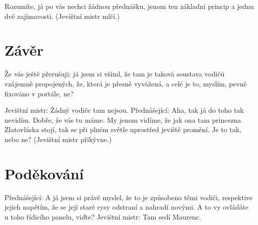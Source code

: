 \documentclass[11pt]{article}
\begin{document}
Rozumíte, já po vás nechci žádnou přednášku, jenom ten základní princip a jednu dvě zajímavosti. (Jevištní mistr mlčí.)
\section{Závěr}
Že vás ještě přerušuji: já jsem si všiml, že tam je taková soustava vodičů vzájemně propojených, že, která je přesně vyvážená, a celé je to, myslím, pevně fixováno v portále, ne?

Jevištní mistr: Žádný vodiče tam nejsou. Přednášející: Aha, tak já do toho tak nevidím. Dobře, že vás tu máme. My jenom vidíme, že jak ona tam princezna Zlatovláska stojí, tak se při plném světle uprostřed jeviště promění. Je to tak, nebo ne? (Jevištní mistr přikývne.)
\section*{Poděkování}
Přednášející: A já jsem si právě myslel, že to je způsobeno těmi vodiči, respektive jejich napětím, že se její staré rysy odstraní a nahradí novými. A to vy ovládáte u toho řídicího panelu, viďte? Jevištní mistr: Tam sedí Maurenc.





% 
% 
\end{document}

